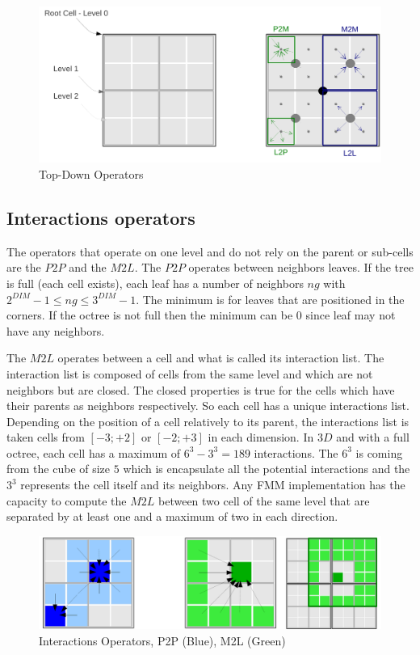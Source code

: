 \documentclass[12pt]{article} %
\begin{document}
\begin{figure}[h]
\centering
\includegraphics[scale=0.6]{Images/TopDownOperators}
\caption{Top-Down Operators}
\end{figure}

\subsection{Interactions operators}
The operators that operate on one level and do not rely on the parent or sub-cells are the $P2P$ and the $M2L$.
The $P2P$ operates between neighbors leaves. If the tree is full (each cell exists), each leaf has a number of neighbors $ng$ with
$2^{DIM} - 1 \leq ng \leq 3^{DIM}-1$.
The minimum is for leaves that are positioned in the corners.
If the octree is not full then the minimum can be $0$ since leaf may not have any neighbors.

The $M2L$ operates between a cell and what is called its interaction list.
The interaction list is composed of cells from the same level and which are not neighbors but are closed.
The closed properties is true for the cells which have their parents as neighbors respectively.
So each cell has a unique interactions list.
Depending on the position of a cell relatively to its parent, the interactions list is taken cells from $[-3;+2]$ or $[-2;+3]$ in each dimension.
In $3D$ and with a full octree, each cell has a maximum of $6^3-3^3 = 189$ interactions.
The $6^3$ is coming from the cube of size $5$ which is encapsulate all the potential interactions and the $3^3$ represents the cell itself and its neighbors.
Any FMM implementation has the capacity to compute the $M2L$ between two cell of the same level that are separated by at least one and a maximum of two in each direction.

\begin{figure}[h]
\centering
\includegraphics[scale=0.6]{Images/InteractionsOperators}
\caption{Interactions Operators, P2P (Blue), M2L (Green)}
\end{figure}
\end{document}

